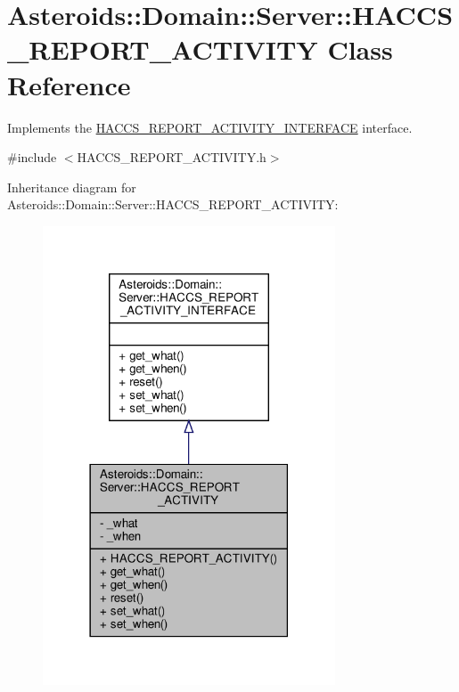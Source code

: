 \hypertarget{classAsteroids_1_1Domain_1_1Server_1_1HACCS__REPORT__ACTIVITY}{}\section{Asteroids\+:\+:Domain\+:\+:Server\+:\+:H\+A\+C\+C\+S\+\_\+\+R\+E\+P\+O\+R\+T\+\_\+\+A\+C\+T\+I\+V\+I\+TY Class Reference}
\label{classAsteroids_1_1Domain_1_1Server_1_1HACCS__REPORT__ACTIVITY}


Implements the \hyperlink{classAsteroids_1_1Domain_1_1Server_1_1HACCS__REPORT__ACTIVITY__INTERFACE}{H\+A\+C\+C\+S\+\_\+\+R\+E\+P\+O\+R\+T\+\_\+\+A\+C\+T\+I\+V\+I\+T\+Y\+\_\+\+I\+N\+T\+E\+R\+F\+A\+CE} interface.  




{\ttfamily \#include $<$H\+A\+C\+C\+S\+\_\+\+R\+E\+P\+O\+R\+T\+\_\+\+A\+C\+T\+I\+V\+I\+T\+Y.\+h$>$}



Inheritance diagram for Asteroids\+:\+:Domain\+:\+:Server\+:\+:H\+A\+C\+C\+S\+\_\+\+R\+E\+P\+O\+R\+T\+\_\+\+A\+C\+T\+I\+V\+I\+TY\+:\nopagebreak
\begin{figure}[H]
\begin{center}
\leavevmode
\includegraphics[width=246pt]{classAsteroids_1_1Domain_1_1Server_1_1HACCS__REPORT__ACTIVITY__inherit__graph}
\end{center}
\end{figure}


